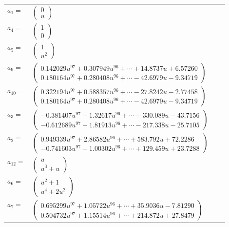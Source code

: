\documentclass[1p]{elsarticle_modified}
\theoremstyle{definition}
\begin{document}
\begin{tabular}{m{7pt} m{180pt} m{7pt} m{180pt} }
\flushright $a_{1}=$&$\begin{pmatrix}0\\u\end{pmatrix}$ \\
\flushright $a_{4}=$&$\begin{pmatrix}1\\0\end{pmatrix}$ \\
\flushright $a_{5}=$&$\begin{pmatrix}1\\u^2\end{pmatrix}$ \\
\flushright $a_{9}=$&$\begin{pmatrix}0.142029 u^{97}+0.307949 u^{96}+\cdots+14.8737 u+6.57260\\0.180164 u^{97}+0.280408 u^{96}+\cdots-42.6979 u-9.34719\end{pmatrix}$ \\
\flushright $a_{10}=$&$\begin{pmatrix}0.322194 u^{97}+0.588357 u^{96}+\cdots-27.8242 u-2.77458\\0.180164 u^{97}+0.280408 u^{96}+\cdots-42.6979 u-9.34719\end{pmatrix}$ \\
\flushright $a_{3}=$&$\begin{pmatrix}-0.381407 u^{97}-1.32617 u^{96}+\cdots-330.089 u-43.7156\\-0.612689 u^{97}-1.81913 u^{96}+\cdots-217.338 u-25.7105\end{pmatrix}$ \\
\flushright $a_{2}=$&$\begin{pmatrix}0.949339 u^{97}+2.86582 u^{96}+\cdots+583.792 u+72.2286\\-0.741603 u^{97}-1.00302 u^{96}+\cdots+129.459 u+23.7288\end{pmatrix}$ \\
\flushright $a_{12}=$&$\begin{pmatrix}u\\u^3+u\end{pmatrix}$ \\
\flushright $a_{6}=$&$\begin{pmatrix}u^2+1\\u^4+2 u^2\end{pmatrix}$ \\
\flushright $a_{7}=$&$\begin{pmatrix}0.695299 u^{97}+1.05722 u^{96}+\cdots+35.9036 u-7.81290\\0.504732 u^{97}+1.15514 u^{96}+\cdots+214.872 u+27.8479\end{pmatrix}$ \\

\end{tabular}
\end{document}
